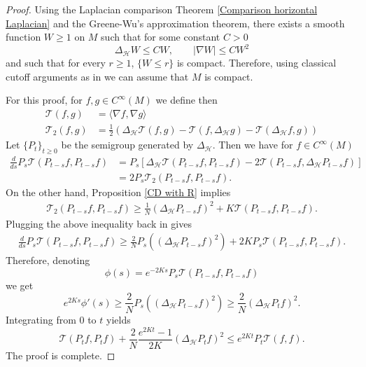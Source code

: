 \documentclass[11pt]{article}
\numberwithin{equation}{section}
\newcommand{\Ho}{\mathcal H}
\begin{document}
\begin{proof}
Using the Laplacian comparison Theorem \ref{Comparison horizontal Laplacian} and the Greene-Wu's approximation theorem, there exists a smooth function $W \ge 1 $ on $M$   such that for some constant $C>0$
\[
\Delta_\Ho W \le C W, \qquad | \nabla W | \le CW^2
\]
and such that for every $r \ge 1$, $\{ W \le r \}$ is compact.
Therefore, using classical cutoff arguments as in \cite[Proof of Lemma 5.2.2]{FYWbook} we can assume that $M$ is compact.

For this proof, for $f,g \in C^\infty(M)$ we define then
		\begin{align*}
			\mathcal{T}(f,g)&=\langle \nabla f, \nabla g \rangle\\
			\mathcal{T}_2(f,g)&=\frac{1}{2}( \Delta_\Ho \mathcal{T}(f,g)-\mathcal{T} (f, \Delta_\Ho g)-\mathcal{T}(\Delta_\Ho f, g) )
		\end{align*}
		Let $\{P_t \}_{t\geq 0}$ be the semigroup generated by $\Delta_\Ho$. Then we have for $f \in C^\infty(M)$
		\begin{align*}
			\frac{d}{ds}P_s\mathcal{T}(P_{t-s}f,P_{t-s}f )&=P_s\left[\Delta_{\mathcal{H}}\mathcal{T}(P_{t-s}f,P_{t-s}f)-2\mathcal{T}(P_{t-s}f, \Delta_{\mathcal{H}}P_{t-s}f ) \right]\\
			&=2P_s\mathcal{T}_2(P_{t-s}f,P_{t-s}f).
		\end{align*}
		On the other hand, Proposition \ref{CD with R} implies
		\begin{align*}
			\mathcal{T}_2(P_{t-s}f,P_{t-s}f)\geq \frac{1}{N}(\Delta_{\mathcal{H}} P_{t-s}f)^2+K \mathcal{T}(P_{t-s}f,P_{t-s}f).
		\end{align*}
		Plugging the above inequality back in gives
		\begin{align*}
			\frac{d}{ds}P_s\mathcal{T}(P_{t-s}f,P_{t-s}f )\geq \frac{2}{N}P_s ((\Delta_{\mathcal{H}} P_{t-s}f)^2)+2K P_s\mathcal{T}(P_{t-s}f,P_{t-s}f).
		\end{align*}
        Therefore, denoting
        \[
        \phi(s)=e^{-2Ks} P_s\mathcal{T}(P_{t-s}f,P_{t-s}f )
        \]
        we get
        \[
        e^{2 Ks}\phi'(s) \ge \frac{2}{N}P_s( (\Delta_{\mathcal{H}} P_{t-s}f)^2) \ge \frac{2}{N} (\Delta_{\mathcal{H}} P_{t}f)^2.
        \]
        Integrating from $0$ to $t$ yields
        \[
        \mathcal{T}(P_{t}f,P_{t}f )+\frac{2}{N}\frac{e^{2Kt}-1}{2K} (\Delta_{\mathcal{H}} P_{t}f)^2 \le e^{2Kt}P_t \mathcal{T}(f,f).
        \]
		The proof is complete.
\end{proof}
\end{document}
